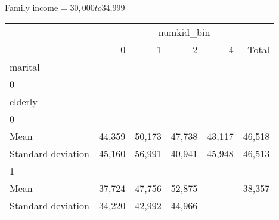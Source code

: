 Family income = $30,000 to $34,999
\begin{tabular}{llllll}
\cline{1-6}
\multicolumn{1}{c}{} &
  \multicolumn{5}{|c}{numkid\_bin} \\
\multicolumn{1}{c}{} &
  \multicolumn{1}{|r}{0} &
  \multicolumn{1}{r}{1} &
  \multicolumn{1}{r}{2} &
  \multicolumn{1}{r}{4} &
  \multicolumn{1}{r}{Total} \\
\cline{1-6}
\multicolumn{1}{l}{marital} &
  \multicolumn{1}{|r}{} &
  \multicolumn{1}{r}{} &
  \multicolumn{1}{r}{} &
  \multicolumn{1}{r}{} &
  \multicolumn{1}{r}{} \\
\multicolumn{1}{l}{\hspace{1em}0} &
  \multicolumn{1}{|r}{} &
  \multicolumn{1}{r}{} &
  \multicolumn{1}{r}{} &
  \multicolumn{1}{r}{} &
  \multicolumn{1}{r}{} \\
\multicolumn{1}{l}{\hspace{2em}elderly} &
  \multicolumn{1}{|r}{} &
  \multicolumn{1}{r}{} &
  \multicolumn{1}{r}{} &
  \multicolumn{1}{r}{} &
  \multicolumn{1}{r}{} \\
\multicolumn{1}{l}{\hspace{3em}0} &
  \multicolumn{1}{|r}{} &
  \multicolumn{1}{r}{} &
  \multicolumn{1}{r}{} &
  \multicolumn{1}{r}{} &
  \multicolumn{1}{r}{} \\
\multicolumn{1}{l}{\hspace{4em}Mean} &
  \multicolumn{1}{|r}{44,359} &
  \multicolumn{1}{r}{50,173} &
  \multicolumn{1}{r}{47,738} &
  \multicolumn{1}{r}{43,117} &
  \multicolumn{1}{r}{46,518} \\
\multicolumn{1}{l}{\hspace{4em}Standard deviation} &
  \multicolumn{1}{|r}{45,160} &
  \multicolumn{1}{r}{56,991} &
  \multicolumn{1}{r}{40,941} &
  \multicolumn{1}{r}{45,948} &
  \multicolumn{1}{r}{46,513} \\
\multicolumn{1}{l}{\hspace{3em}1} &
  \multicolumn{1}{|r}{} &
  \multicolumn{1}{r}{} &
  \multicolumn{1}{r}{} &
  \multicolumn{1}{r}{} &
  \multicolumn{1}{r}{} \\
\multicolumn{1}{l}{\hspace{4em}Mean} &
  \multicolumn{1}{|r}{37,724} &
  \multicolumn{1}{r}{47,756} &
  \multicolumn{1}{r}{52,875} &
  \multicolumn{1}{r}{} &
  \multicolumn{1}{r}{38,357} \\
\multicolumn{1}{l}{\hspace{4em}Standard deviation} &
  \multicolumn{1}{|r}{34,220} &
  \multicolumn{1}{r}{42,992} &
  \multicolumn{1}{r}{44,966} &

\end{tabular}
